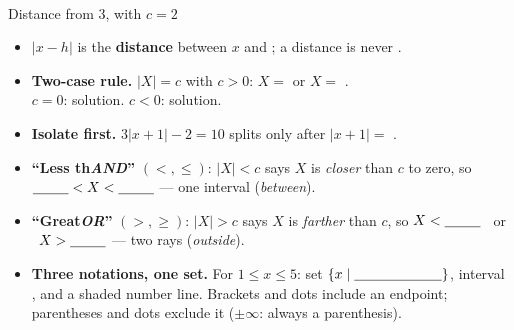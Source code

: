 \documentclass[12pt]{article}
\newcommand{\numline}[2]{%
  \draw[->, semithick, charcoal] (#1-0.5,0)--(#2+0.5,0);
  \foreach \x in {#1,...,#2}{\draw[charcoal] (\x,0.12)--(\x,-0.12) node[below, font=\scriptsize]{$\x$};}}
\begin{document}
\boxguard[14]
\begin{tcolorbox}[enhanced, colback=sky, colframe=navy, boxrule=0.8pt, arc=2mm,
    left=3mm, right=3mm, top=1.5mm, bottom=1.5mm, breakable,
    fonttitle=\bfseries\small\color{white}, title={QuickNotes: Absolute Value Equations \& Inequalities},
    attach boxed title to top left={yshift=-2mm, xshift=4mm},
    boxed title style={colback=navy, colframe=navy, arc=1.5mm}]
\small
\begin{minipage}[t]{0.31\linewidth}
\vspace{2pt}\centering
{}\\[1pt]
{\footnotesize Distance from $3$, with $c=2$}
\end{minipage}\hfill
\begin{minipage}[t]{0.65\linewidth}
\vspace{0pt}
\begin{itemize}[leftmargin=1.1em, itemsep=4pt, topsep=0pt]
  \item $|x-h|$ is the \textbf{distance} between $x$ and \blank{0.9cm}; a distance is never
        \blank{1.7cm}.
  \item \textbf{Two-case rule.} $|X| = c$ with $c>0$: \; $X = $ \blank{1.0cm} or $X = $
        \blank{1.0cm}. \\
        $c=0$: \blank{1.0cm} solution. \quad $c<0$: \blank{1.0cm} solution.
  \item \textbf{Isolate first.} $3|x+1|-2=10$ splits only after $|x+1| = $ \blank{0.9cm}.
\end{itemize}
\end{minipage}

\vspace{4pt}
\begin{itemize}[leftmargin=1.1em, itemsep=4pt, topsep=0pt]
  \item \textbf{``Less th\emph{AND}''} $(<,\le)$: $|X|<c$ says $X$ is \emph{closer} than $c$ to
        zero, so \; $\blank{0.9cm} < X < \blank{0.9cm}$ --- one interval (\emph{between}).
  \item \textbf{``Great\emph{OR}''} $(>,\ge)$: $|X|>c$ says $X$ is \emph{farther} than $c$, so \;
        $X < \blank{0.9cm}$ \, or \, $X > \blank{0.9cm}$ --- two rays (\emph{outside}).
  \item \textbf{Three notations, one set.} For $1 \le x \le 5$: \; set $\{x \mid \blank{2.2cm}\}$,
        \; interval \blank{1.8cm}, \; and a shaded number line. Brackets and \blank{1.4cm} dots
        include an endpoint; parentheses and \blank{1.4cm} dots exclude it ($\pm\infty$: always a
        parenthesis).
\end{itemize}
\end{tcolorbox}
\end{document}
